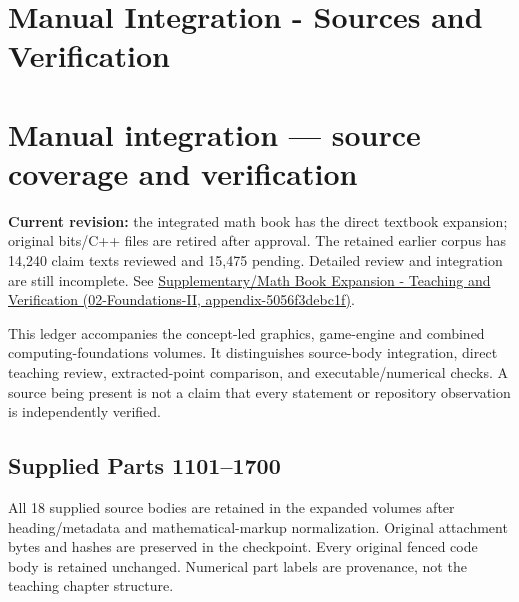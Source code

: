 \hypertarget{appendix-3b67654799a2}{}
\section*{Manual Integration - Sources and Verification}
\section{Manual integration --- source coverage and verification}\label{appendix-3b67654799a2-manual-integration-source-coverage-and-verification}

\textbf{Current revision:} the integrated math book has the direct textbook expansion; original bits/C++ files are retired after approval. The retained earlier corpus has 14,240 claim texts reviewed and 15,475 pending. Detailed review and integration are still incomplete. See \href{../02-Foundations-II/main.pdf\#nameddest=appendix-5056f3debc1f}{Supplementary/Math Book Expansion - Teaching and Verification (02-Foundations-II, appendix-5056f3debc1f)}.

This ledger accompanies the concept-led graphics, game-engine and combined computing-foundations volumes. It distinguishes source-body integration, direct teaching review, extracted-point comparison, and executable/numerical checks. A source being present is not a claim that every statement or repository observation is independently verified.

\subsection{Supplied Parts 1101--1700}\label{appendix-3b67654799a2-supplied-parts-11011700}

All 18 supplied source bodies are retained in the expanded volumes after heading/metadata and mathematical-markup normalization. Original attachment bytes and hashes are preserved in the checkpoint. Every original fenced code body is retained unchanged. Numerical part labels are provenance, not the teaching chapter structure.

